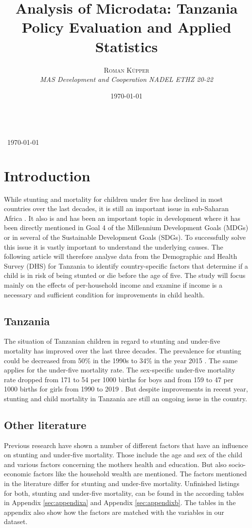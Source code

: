\documentclass[a4paper, 11pt]{article} %
\title{\textbf{Analysis of Microdata: Tanzania}\\ %
Policy Evaluation and Applied Statistics } %
\author{\textsc{Roman Küpper} %
\\{\textit{MAS Development and Cooperation NADEL ETHZ 20-22}}} %
\date{\today} %
\makeatletter
\renewcommand{\maketitle}{ %
\begin{flushright} %
{\LARGE\@title} %
\vspace{50pt} %

{\large\@author} %
\\\ \today %

\vspace{40pt} %
\end{flushright}
}
\makeatother
\begin{document}
\maketitle %



\section{Introduction}
While stunting and mortality for children under five has declined in most countries over the last decades, it is still an important issue in sub-Saharan Africa \cite{Nshimyiryo2019Dec}. It also is and has been an important topic in development where it has been directly mentioned in Goal 4 of the Millennium Development Goals (MDGs) or in several of the Sustainable Development Goals (SDGs). To successfully solve this issue it is vastly important to understand the underlying causes. The following article will therefore analyse data from the Demographic and Health Survey (DHS) for Tanzania to identify country-specific factors that determine if a child is in risk of being stunted or die before the age of five. The study will focus mainly on the effects of per-household income and examine if income is a necessary and sufficient condition for improvements in child health.

\subsection*{Tanzania}
The situation of Tanzanian children in regard to stunting and under-five mortality has improved over the last three decades. The prevalence for stunting could be decreased from 50\% in the 1990s to 34\% in the year 2015 \cite{UNI18}. The same applies for the under-five mortality rate. The sex-specific under-five mortality rate dropped from 171 to 54 per 1000 births for boys and from 159 to 47 per 1000 births for girls from 1990 to 2019 \cite{UN20}. But despite improvements in recent year, stunting and child mortality in Tanzania are still an ongoing issue in the country. 


\subsection*{Other literature}
Previous research have shown a number of different factors that have an influence on stunting and under-five mortality. Those include the age and sex of the child and various factors concerning the mothers health and education. But also socio-economic factors like the household wealth are mentioned. The factors mentioned in the literature differ for stunting and under-five mortality. Unfinished listings for both, stunting and under-five mortality, can be found in the according tables in Appendix \ref{sec:appendixa} and Appendix \ref{sec:appendixb}.  The tables in the appendix also show how the factors are matched with the variables in our dataset.
\end{document}
